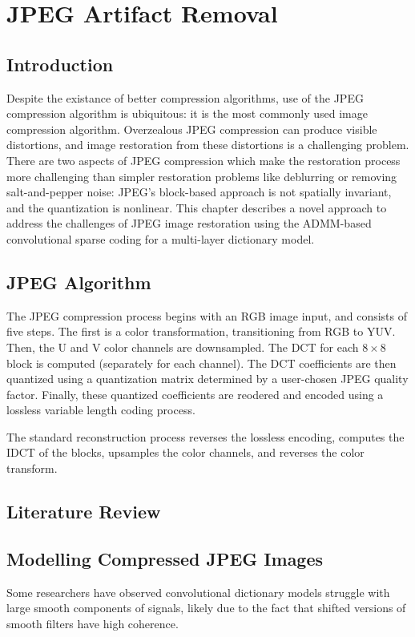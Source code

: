\chapter{JPEG Artifact Removal}
\section{Introduction}
Despite the existance of better compression algorithms, use of the JPEG compression algorithm is ubiquitous: it is the most commonly used image compression algorithm.  Overzealous JPEG compression can produce visible distortions, and image restoration from these distortions is a challenging problem. There are two aspects of JPEG compression which make the restoration process more challenging than simpler restoration problems like deblurring or removing salt-and-pepper noise: JPEG's block-based approach is not spatially invariant, and the quantization is nonlinear. This chapter describes a novel approach to address the challenges of JPEG image restoration using the ADMM-based convolutional sparse coding for a multi-layer dictionary model.
\section{JPEG Algorithm}

The JPEG compression process begins with an RGB image input, and consists of five steps. The first is a color transformation, transitioning from RGB to YUV. Then, the U and V color channels are downsampled.  The DCT for each $8 \times 8$ block is computed (separately for each channel).  The DCT coefficients are then quantized using a quantization matrix determined by a user-chosen JPEG quality factor. Finally, these quantized coefficients are reodered and encoded using a lossless variable length coding process.

The standard reconstruction process reverses the lossless encoding, computes the IDCT of the blocks, upsamples the color channels, and reverses the color transform.
\section{Literature Review}
\section{Modelling Compressed JPEG Images}
Some researchers have observed convolutional dictionary models struggle with large smooth components of signals, likely due to the fact that shifted versions of smooth filters have high coherence.

